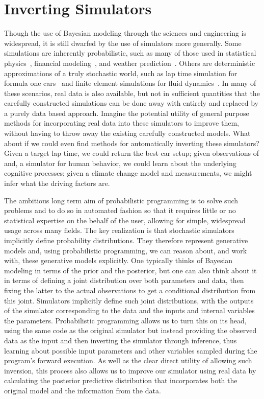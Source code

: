
\section{Inverting Simulators}
\label{sec:probprog:inv}

Though the use of Bayesian modeling through the sciences and engineering is widespread,
it is still dwarfed by the use of simulators more generally.  Some simulations are inherently
probabilistic, such as many of those used in statistical physics~\citep{landau2014guide},
 financial modeling~\citep{jackel2002monte}, and weather prediction~\cite{evensen1994sequential}.  
 Others are deterministic approximations
of a truly stochastic world, such as lap time simulation for formula one cars~\citep{perantoni2014optimal}
and finite element simulations for fluid dynamics~\citep{versteeg2007introduction}.
In many of these scenarios, real data is also available, but not in sufficient quantities that the carefully
constructed simulations can be done away with entirely and replaced by a purely data based
approach.  
Imagine the potential utility of general purpose methods for incorporating real data
into these simulators to improve them, without having to throw away the existing carefully constructed models.  
What about if we could even find methods for automatically
inverting these simulators?  Given a target lap time, we could return the best car setup; given observations
of and, a simulator for human behavior, we could learn about the underlying cognitive processes; given
a climate change model and measurements, we might infer what the driving factors are.  

The ambitious long
term aim of probabilistic programming is to solve such problems and to do so in automated fashion
so that it requires little or no statistical expertise on the behalf of the user, allowing for simple, widespread usage
across many fields.  The key realization is that stochastic simulators implicitly define probability distributions.
They therefore represent generative models and, using probabilistic programming, we can reason about, and
work with, these generative models explicitly.  One typically thinks of Bayesian modeling in terms of the
prior and the posterior, but one can also think about it in terms of defining a joint distribution over
both parameters and data, then fixing the latter to the actual observations to get a conditional distribution from
this joint.  Simulators implicitly define such joint distributions, with the outputs of the simulator corresponding
to the data and the inputs and internal variables the parameters.  Probabilistic programming allows us to turn this on its head,
using the same code as the original simulator but instead providing the observed data as the input and
then inverting the simulator through inference, thus learning about possible input parameters and other 
variables sampled during the program's forward execution.  
As well as the clear direct utility of allowing such inversion, this process also allows us to improve
our simulator using real data by calculating the posterior predictive distribution that incorporates both
the original model and the information from the data.

